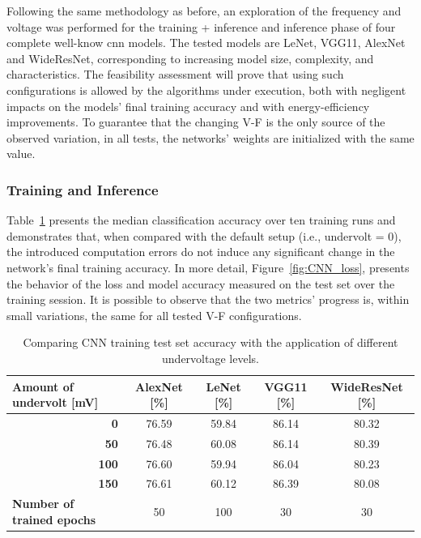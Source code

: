 Following the same methodology as before, an exploration of the frequency and voltage was performed for the training + inference and inference phase of four complete well-know \acrshort{cnn} models. The tested models are LeNet, VGG11, AlexNet and WideResNet, corresponding to increasing model size, complexity, and characteristics. The feasibility assessment will prove that using such configurations is allowed by the algorithms under execution, both with negligent impacts on the models' final training accuracy and with energy-efficiency improvements. To guarantee that the changing V-F is the only source of the observed variation, in all tests, the networks' weights are initialized with the same value.


\subsubsection{Training and Inference}

Table~\ref{tab:trainingAcc} presents the median classification accuracy over ten training runs and demonstrates that, when compared with the default setup (i.e., undervolt = 0), the introduced computation errors do not induce any significant change in the network's final training accuracy. 
In more detail, Figure~\ref{fig:CNN_loss}, presents the behavior of the loss and model accuracy measured on the test set over the training session. It is possible to observe that the two metrics' progress is, within small variations, the same for all tested V-F configurations.

\begin{table}[htb]
    \centering
   
    \label{tab:trainingAcc}
    \begin{tabular}{rcccc}
        \multicolumn{1}{l}{{\textbf{Amount of undervolt {[}mV{]}}}} &
          \textbf{AlexNet {[}\%{]}} &
          \textbf{LeNet {[}\%{]}} &
          \textbf{VGG11 {[}\%{]}} &
          \textbf{WideResNet {[}\%{]}} \\ \hline
        \textbf{0}   & 76.59 & 59.84 & 86.14 & 80.32 \\
        \textbf{50}  & 76.48 & 60.08 & 86.14 & 80.39 \\
        \textbf{100} & 76.60 & 59.94 & 86.04 & 80.23 \\
        \textbf{150} & 76.61 & 60.12 & 86.39 & 80.08 \\ \hline
        \multicolumn{1}{l}{{\textbf{Number of trained epochs}}} &
          50 &
          100 &
          30 &
          30
    \end{tabular}%
     \caption{Comparing CNN training test set accuracy with the application of different undervoltage levels.}
\end{table}

